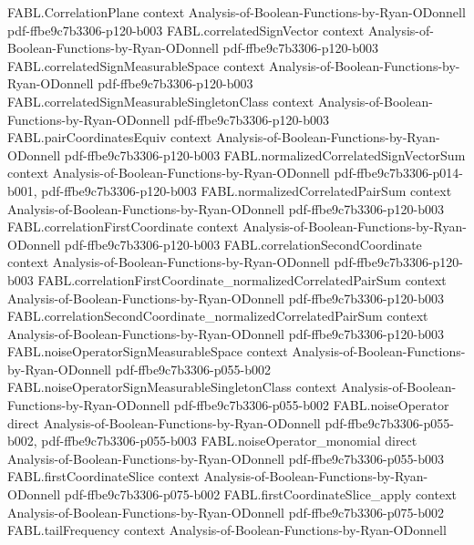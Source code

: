 \begin{theorem}
  {FABL.CorrelationPlane}
  {context}
  {Analysis-of-Boolean-Functions-by-Ryan-ODonnell}
  {pdf-ffbe9c7b3306-p120-b003}
\proofstep
  {FABL.correlatedSignVector}
  {context}
  {Analysis-of-Boolean-Functions-by-Ryan-ODonnell}
  {pdf-ffbe9c7b3306-p120-b003}
\proofstep
  {FABL.correlatedSignMeasurableSpace}
  {context}
  {Analysis-of-Boolean-Functions-by-Ryan-ODonnell}
  {pdf-ffbe9c7b3306-p120-b003}
\proofstep
  {FABL.correlatedSignMeasurableSingletonClass}
  {context}
  {Analysis-of-Boolean-Functions-by-Ryan-ODonnell}
  {pdf-ffbe9c7b3306-p120-b003}
\proofstep
  {FABL.pairCoordinatesEquiv}
  {context}
  {Analysis-of-Boolean-Functions-by-Ryan-ODonnell}
  {pdf-ffbe9c7b3306-p120-b003}
\proofstep
  {FABL.normalizedCorrelatedSignVectorSum}
  {context}
  {Analysis-of-Boolean-Functions-by-Ryan-ODonnell}
  {pdf-ffbe9c7b3306-p014-b001,
    pdf-ffbe9c7b3306-p120-b003}
\proofstep
  {FABL.normalizedCorrelatedPairSum}
  {context}
  {Analysis-of-Boolean-Functions-by-Ryan-ODonnell}
  {pdf-ffbe9c7b3306-p120-b003}
\proofstep
  {FABL.correlationFirstCoordinate}
  {context}
  {Analysis-of-Boolean-Functions-by-Ryan-ODonnell}
  {pdf-ffbe9c7b3306-p120-b003}
\proofstep
  {FABL.correlationSecondCoordinate}
  {context}
  {Analysis-of-Boolean-Functions-by-Ryan-ODonnell}
  {pdf-ffbe9c7b3306-p120-b003}
\proofstep
  {FABL.correlationFirstCoordinate_normalizedCorrelatedPairSum}
  {context}
  {Analysis-of-Boolean-Functions-by-Ryan-ODonnell}
  {pdf-ffbe9c7b3306-p120-b003}
\proofstep
  {FABL.correlationSecondCoordinate_normalizedCorrelatedPairSum}
  {context}
  {Analysis-of-Boolean-Functions-by-Ryan-ODonnell}
  {pdf-ffbe9c7b3306-p120-b003}
\proofstep
  {FABL.noiseOperatorSignMeasurableSpace}
  {context}
  {Analysis-of-Boolean-Functions-by-Ryan-ODonnell}
  {pdf-ffbe9c7b3306-p055-b002}
\proofstep
  {FABL.noiseOperatorSignMeasurableSingletonClass}
  {context}
  {Analysis-of-Boolean-Functions-by-Ryan-ODonnell}
  {pdf-ffbe9c7b3306-p055-b002}
\proofstep
  {FABL.noiseOperator}
  {direct}
  {Analysis-of-Boolean-Functions-by-Ryan-ODonnell}
  {pdf-ffbe9c7b3306-p055-b002,
    pdf-ffbe9c7b3306-p055-b003}
\proofstep
  {FABL.noiseOperator_monomial}
  {direct}
  {Analysis-of-Boolean-Functions-by-Ryan-ODonnell}
  {pdf-ffbe9c7b3306-p055-b003}
\proofstep
  {FABL.firstCoordinateSlice}
  {context}
  {Analysis-of-Boolean-Functions-by-Ryan-ODonnell}
  {pdf-ffbe9c7b3306-p075-b002}
\proofstep
  {FABL.firstCoordinateSlice_apply}
  {context}
  {Analysis-of-Boolean-Functions-by-Ryan-ODonnell}
  {pdf-ffbe9c7b3306-p075-b002}
\proofstep
  {FABL.tailFrequency}
  {context}
  {Analysis-of-Boolean-Functions-by-Ryan-ODonnell}

\end{theorem}
